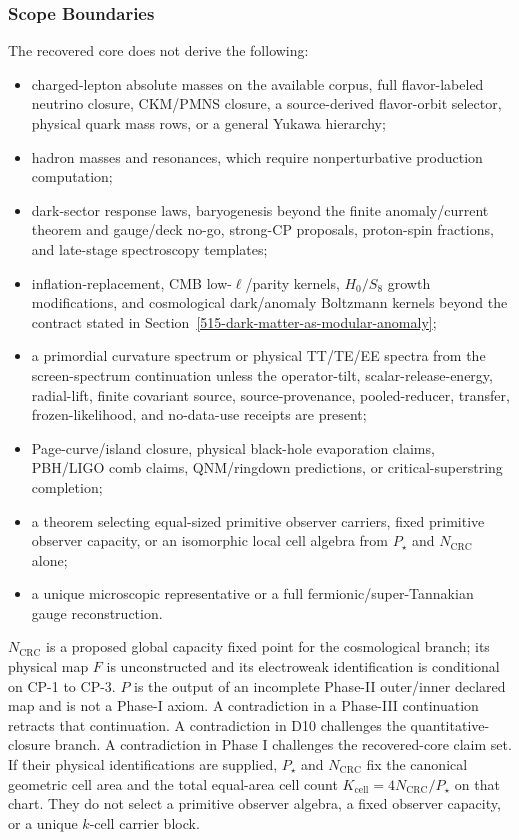 \subsubsection{Scope Boundaries}\label{84-what-is-not-predicted-gaps}

The recovered core does not derive the following:
\begin{itemize}
\item charged-lepton absolute masses on the available corpus, full flavor-labeled neutrino closure, CKM/PMNS closure, a source-derived flavor-orbit selector, physical quark mass rows, or a general Yukawa hierarchy;
\item hadron masses and resonances, which require nonperturbative production computation;
\item dark-sector response laws, baryogenesis beyond the finite anomaly/current theorem and gauge/deck no-go, strong-CP proposals, proton-spin fractions, and
late-stage spectroscopy templates;
\item inflation-replacement, CMB low-\(\ell\)/parity kernels, \(H_0/S_8\) growth modifications,
and cosmological dark/anomaly Boltzmann kernels beyond the contract stated in Section~\ref{515-dark-matter-as-modular-anomaly};
\item a primordial curvature spectrum or physical TT/TE/EE spectra from the screen-spectrum
continuation unless the operator-tilt, scalar-release-energy, radial-lift, finite covariant source,
source-provenance, pooled-reducer, transfer, frozen-likelihood, and no-data-use receipts are present;
\item Page-curve/island closure, physical black-hole evaporation claims, PBH/LIGO comb claims,
QNM/ringdown predictions, or critical-superstring completion;
\item a theorem selecting equal-sized primitive observer carriers, fixed primitive observer
capacity, or an isomorphic local cell algebra from \(P_\star\) and \(N_{\mathrm{CRC}}\) alone;
\item a unique microscopic representative or a full fermionic/super-Tannakian gauge reconstruction.
\end{itemize}

\(N_{\mathrm{CRC}}\) is a proposed global capacity fixed point for the cosmological branch; its
physical map \(F\) is unconstructed and its electroweak identification is conditional on CP-1 to
CP-3. \(P\) is the output of an incomplete Phase-II outer/inner declared map and is not a Phase-I axiom. A contradiction in a
Phase-III continuation retracts that continuation. A contradiction in D10 challenges the
quantitative-closure branch. A contradiction in Phase I challenges the recovered-core claim set.
If their physical identifications are supplied, \(P_\star\) and \(N_{\mathrm{CRC}}\) fix the canonical geometric cell area and the total equal-area
cell count \(K_{\mathrm{cell}}=4N_{\mathrm{CRC}}/P_\star\) on that chart. They do not select a
primitive observer algebra, a fixed observer capacity, or a unique \(k\)-cell carrier block.

